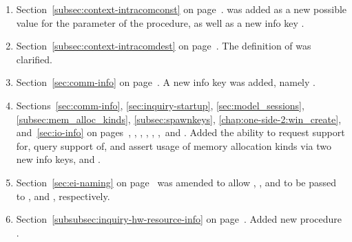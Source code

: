 \begin{enumerate}
\item
  Section~\ref{subsec:context-intracomconst} on page~\pageref{subsec:context-intracomconst}.
  \newline
   was added as a new possible value for the 
  parameter of the  procedure, as well as a new info key
  .

\item\label{item:changes:issue543-PR791}
  Section~\ref{subsec:context-intracomdest} on page~\pageref{subsec:context-intracomdest}.
  \newline
  The definition of  was clarified.

\item
   Section~\ref{sec:comm-info} on page~\pageref{sec:comm-info}.
   \newline
   A new info key was added, namely
   .

\item
    Sections~\ref{sec:comm-info}, \ref{sec:inquiry-startup}, \ref{sec:model_sessions}, \ref{subsec:mem_alloc_kinds}, \ref{subsec:spawnkeys}, \ref{chap:one-side-2:win_create}, and~\ref{sec:io-info}
    on pages~\pageref{sec:comm-info}, \pageref{sec:inquiry-startup}, \pageref{sec:model_sessions}, \pageref{subsec:mem_alloc_kinds}, \pageref{subsec:spawnkeys}, \pageref{chap:one-side-2:win_create},~and \pageref{sec:io-info}.
    \newline
    Added the ability to request support for, query support of, and assert
    usage of memory allocation kinds via two new info keys,
     and
    .

\item
  Section~\ref{sec:ei-naming} on page~\pageref{sec:ei-naming}
  was amended to allow ,
  , and  to be
  passed to ,
   and
  , respectively.

\item
  Section~\ref{subsubsec:inquiry-hw-resource-info} on page~\pageref{subsubsec:inquiry-hw-resource-info}.
  \newline
  Added new procedure .


\end{enumerate}
